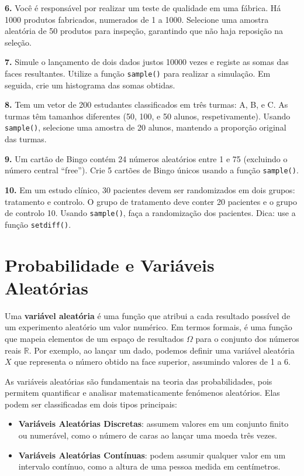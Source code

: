 \documentclass[
]{book}
\providecommand{\tightlist}{%
  \setlength{\itemsep}{0pt}\setlength{\parskip}{0pt}}
\begin{document}
\textbf{6.} Você é responsável por realizar um teste de qualidade em uma
fábrica. Há 1000 produtos fabricados, numerados de 1 a 1000. Selecione
uma amostra aleatória de 50 produtos para inspeção, garantindo que não
haja reposição na seleção.

\textbf{7.} Simule o lançamento de dois dados justos 10000 vezes e registe as
somas das faces resultantes. Utilize a função \texttt{sample()} para realizar a
simulação. Em seguida, crie um histograma das somas obtidas.

\textbf{8.} Tem um vetor de 200 estudantes classificados em três turmas: A,
B, e C. As turmas têm tamanhos diferentes (50, 100, e 50 alunos,
respetivamente). Usando \texttt{sample()}, selecione uma amostra de 20 alunos,
mantendo a proporção original das turmas.

\textbf{9.} Um cartão de Bingo contém 24 números aleatórios entre 1 e 75
(excluindo o número central ``free''). Crie 5 cartões de Bingo únicos
usando a função \texttt{sample()}.

\textbf{10.} Em um estudo clínico, 30 pacientes devem ser randomizados em
dois grupos: tratamento e controlo. O grupo de tratamento deve conter 20
pacientes e o grupo de controlo 10. Usando \texttt{sample()}, faça a
randomização dos pacientes. Dica: use a função \texttt{setdiff()}.

\chapter{Probabilidade e Variáveis Aleatórias}\label{probabilidade-e-variuxe1veis-aleatuxf3rias}

Uma \textbf{variável aleatória} é uma função que atribui a cada resultado possível de um experimento aleatório um valor numérico. Em termos formais, é uma função que mapeia elementos de um espaço de resultados \(\Omega\) para o conjunto dos números reais \(\mathbb{R}\). Por exemplo, ao lançar um dado, podemos definir uma variável aleatória \(X\) que representa o número obtido na face superior, assumindo valores de 1 a 6.

As variáveis aleatórias são fundamentais na teoria das probabilidades, pois permitem quantificar e analisar matematicamente fenómenos aleatórios. Elas podem ser classificadas em dois tipos principais:

\begin{itemize}
\tightlist
\item
  \textbf{Variáveis Aleatórias Discretas}: assumem valores em um conjunto finito ou numerável, como o número de caras ao lançar uma moeda três vezes.
\item
  \textbf{Variáveis Aleatórias Contínuas}: podem assumir qualquer valor em um intervalo contínuo, como a altura de uma pessoa medida em centímetros.
\end{itemize}
\end{document}
